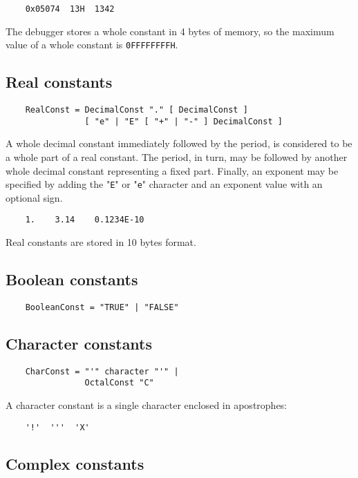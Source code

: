 \verb'    0x05074  13H  1342'

The debugger stores a whole constant in 4 bytes of memory,
so the maximum value of a whole constant is \verb'0FFFFFFFFH'.

\subsection{Real constants}

\begin{verbatim}
    RealConst = DecimalConst "." [ DecimalConst ]
                [ "e" | "E" [ "+" | "-" ] DecimalConst ]
\end{verbatim}

A whole decimal constant immediately followed by the period,
is considered to be a whole part of a real constant. The period,
in turn, may be followed by another whole decimal constant
representing a fixed part. Finally, an exponent may be specified
by adding the "\verb'E'" or "\verb'e'" character and an exponent
value with an optional sign.

\verb'    1.    3.14    0.1234E-10'

Real constants are stored in 10 bytes format.

\subsection{Boolean constants}

\begin{verbatim}
    BooleanConst = "TRUE" | "FALSE"
\end{verbatim}

\subsection{Character constants}

\begin{verbatim}
    CharConst = "'" character "'" |
                OctalConst "C"
\end{verbatim}

A character constant is a single character enclosed in apostrophes:

\verb"    '!'  '''  'X'"

\ifcomment

\subsection{Complex constants}

